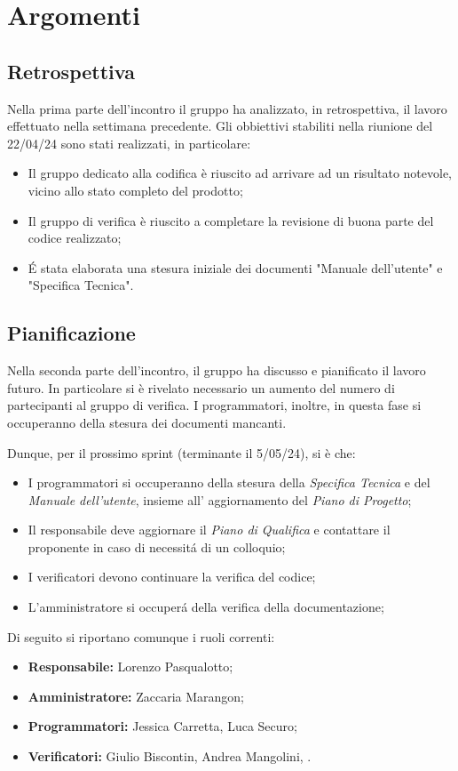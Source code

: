 \section{Argomenti}
\subsection{Retrospettiva}
Nella prima parte dell'incontro il gruppo ha analizzato, in retrospettiva, il lavoro effettuato nella settimana precedente.
Gli obbiettivi stabiliti nella riunione del 22/04/24 sono stati realizzati, in particolare:
\begin{itemize}
    \item Il gruppo dedicato alla codifica è riuscito ad arrivare ad un risultato notevole, vicino allo stato completo del prodotto;
    \item Il gruppo di verifica è riuscito a completare la revisione di buona parte del codice realizzato;
    \item  É stata elaborata una stesura iniziale dei documenti "Manuale dell'utente" e "Specifica Tecnica".
\end{itemize}



\subsection{Pianificazione}
\noindent Nella seconda parte dell'incontro, il gruppo ha discusso e pianificato il lavoro futuro. In particolare si è rivelato necessario un aumento del numero di partecipanti al gruppo di verifica. I programmatori, inoltre, in questa fase si occuperanno della stesura dei documenti mancanti.
\bigskip

\noindent Dunque, per il prossimo sprint (terminante il 5/05/24), si è che:
\begin{itemize}
    \item I programmatori si occuperanno della stesura della \textit{Specifica Tecnica} e del \textit{Manuale dell'utente}, insieme all' aggiornamento del \textit{Piano di Progetto};
    \item Il responsabile deve aggiornare il  \textit{Piano di Qualifica} e contattare il proponente in caso di necessitá di un colloquio;
    \item I verificatori devono continuare la verifica del codice;
    \item L'amministratore si occuperá della verifica della documentazione;
\end{itemize}
\bigskip

Di seguito si riportano comunque i ruoli correnti:
\begin{itemize}
    \item \textbf{Responsabile:} Lorenzo Pasqualotto;
    \item \textbf{Amministratore:} Zaccaria Marangon;
    \item \textbf{Programmatori:} Jessica Carretta, Luca Securo;
    \item \textbf{Verificatori:} Giulio Biscontin, Andrea Mangolini, .
\end{itemize}